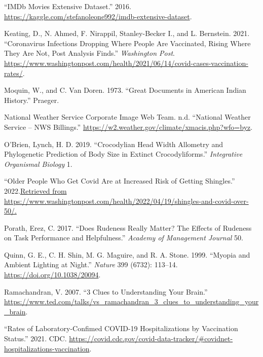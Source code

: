 \documentclass[
]{report}
\newlength{\cslhangindent}
\newlength{\cslentryspacingunit} %
\newenvironment{CSLReferences}[2] %
 {%
  \setlength{\parindent}{0pt}
  \ifodd #1
  \let\oldpar\par
  \def\par{\hangindent=\cslhangindent\oldpar}
  \fi
  \setlength{\parskip}{#2\cslentryspacingunit}
 }%
 {}
\begin{document}
\begin{CSLReferences}{1}{0}
\leavevmode{}%
{``{IMDb} Movies Extensive Dataset.''} 2016. \url{https://kaggle.com/stefanoleone992/imdb-extensive-dataset}.

\leavevmode{}%
Keating, D., N. Ahmed, F. Nirappil, Stanley-Becker I., and L. Bernstein. 2021. {``Coronavirus Infections Dropping Where People Are Vaccinated, Rising Where They Are Not, Post Analysis Finds.''} \emph{Washington Post}. \url{https://www.washingtonpost.com/health/2021/06/14/covid-cases-vaccination-rates/}.

\leavevmode{}%
Moquin, W., and C. Van Doren. 1973. {``Great Documents in American Indian History.''} Praeger.

\leavevmode{}%
National Weather Service Corporate Image Web Team. n.d. {``National Weather Service -- {NWS} Billings.''} \url{https://w2.weather.gov/climate/xmacis.php?wfo=byz}.

\leavevmode{}%
O'Brien, Lynch, H. D. 2019. {``Crocodylian Head Width Allometry and Phylogenetic Prediction of Body Size in Extinct Crocodyliforms.''} \emph{Integrative Organismal Biology} 1.

\leavevmode{}%
{``Older People Who Get Covid Are at Increased Risk of Getting Shingles.''} 2022.\href{\%20Retrieved\%20from\%20https://www.washingtonpost.com/health/2022/04/19/shingles-and-covid-over-50/.}{Retrieved from https://www.washingtonpost.com/health/2022/04/19/shingles-and-covid-over-50/.}

\leavevmode{}%
Porath, Erez, C. 2017. {``Does Rudeness Really Matter? The Effects of Rudeness on Task Performance and Helpfulness.''} \emph{Academy of Management Journal} 50.

\leavevmode{}%
Quinn, G. E., C. H. Shin, M. G. Maguire, and R. A. Stone. 1999. {``Myopia and Ambient Lighting at Night.''} \emph{Nature} 399 (6732): 113--14. \url{https://doi.org/10.1038/20094}.

\leavevmode{}%
Ramachandran, V. 2007. {``3 Clues to Understanding Your Brain.''} \url{https://www.ted.com/talks/vs_ramachandran_3_clues_to_understanding_your_brain}.

\leavevmode{}%
{``Rates of Laboratory-Confimed COVID-19 Hospitalizations by Vaccination Status.''} 2021. CDC. \url{https://covid.cdc.gov/covid-data-tracker/\#covidnet-hospitalizations-vaccination}.


\end{CSLReferences}
\end{document}
